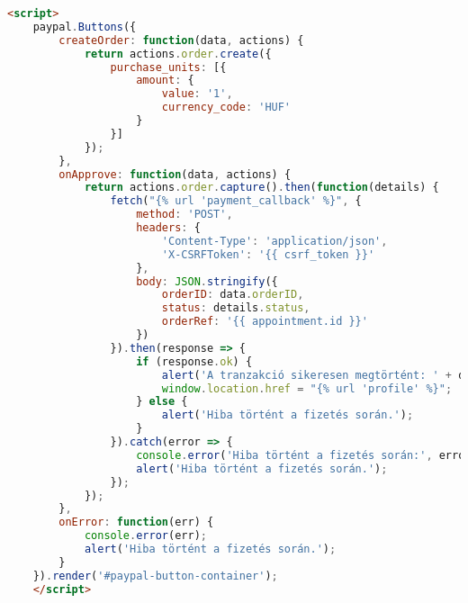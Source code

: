 \begin{lstlisting}[caption={A fizetési logika},label={lst:stringstartswith}, language={HTML}]
	<script>
	paypal.Buttons({
		createOrder: function(data, actions) {
			return actions.order.create({
				purchase_units: [{
					amount: {
						value: '1',
						currency_code: 'HUF'
					}
				}]
			});
		},
		onApprove: function(data, actions) {
			return actions.order.capture().then(function(details) {
				fetch("{% url 'payment_callback' %}", {
					method: 'POST',
					headers: {
						'Content-Type': 'application/json',
						'X-CSRFToken': '{{ csrf_token }}'
					},
					body: JSON.stringify({
						orderID: data.orderID,
						status: details.status,
						orderRef: '{{ appointment.id }}'
					})
				}).then(response => {
					if (response.ok) {
						alert('A tranzakció sikeresen megtörtént: ' + details.payer.name.given_name);
						window.location.href = "{% url 'profile' %}";
					} else {
						alert('Hiba történt a fizetés során.');
					}
				}).catch(error => {
					console.error('Hiba történt a fizetés során:', error);
					alert('Hiba történt a fizetés során.');
				});
			});
		},
		onError: function(err) {
			console.error(err);
			alert('Hiba történt a fizetés során.');
		}
	}).render('#paypal-button-container');
	</script>
	
\end{lstlisting}
